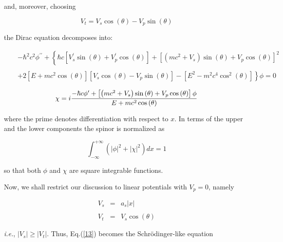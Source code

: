 \documentclass[a4paper,12pt,titlepage]{article}
\begin{document}
\noindent and, moreover, choosing

\begin{equation}
V_{t}=V_{s}\cos \left( \theta \right) -V_{p}\sin \left( \theta \right)
\label{eq12}
\end{equation}

\noindent \noindent the Dirac equation decomposes into:

\begin{eqnarray}
&&-\hbar ^{2}c^{2}\phi ^{\prime \prime }+\left\{ \hbar c\left[ V_{s}^{\prime
}\sin \left( \theta \right) +V_{p}^{\prime }\cos \left( \theta \right)
\right] +\left[ \left( mc^{2}+V_{s}\right) \sin \left( \theta \right)
+V_{p}\cos \left( \theta \right) \right] ^{2}\right.  \nonumber \\
&&  \label{13} \\
&&\left. +2\left[ E+mc^{2}\cos \left( \theta \right) \right] \left[
V_{s}\cos \left( \theta \right) -V_{p}\sin \left( \theta \right) \right]
-\left[ E^{2}-m^{2}c^{4}\cos ^{2}\left( \theta \right) \right] \right\} \phi
=0  \nonumber
\end{eqnarray}

\mathstrut

\begin{equation}
\chi =i\frac{-\hbar c\phi ^{\prime }+\left[ \left( mc^{2}+V_{s}\right) \sin
\left( \theta \right) +V_{p}\cos \left( \theta \right) \right] \phi }{%
E+mc^{2}\cos \left( \theta \right) }  \label{eq14}
\end{equation}

\noindent where the prime denotes differentiation with respect to $x$. In
terms of the upper and the lower components the spinor is normalized as

\begin{equation}
\int_{-\infty }^{+\infty }\left( |\phi |^{2}+|\chi |^{2}\right) dx=1
\label{eq14b}
\end{equation}

\noindent so that both $\phi $ and $\chi $ are square integrable functions.

Now, we shall restrict our discussion to linear potentials with $V_{p}=0$,
namely

\begin{eqnarray}
V_{s} &=&a_{s}|x|  \nonumber \\
&&  \label{eq15} \\
V_{t} &=&V_{s}\cos (\theta )  \nonumber
\end{eqnarray}

\noindent \textit{i.e.}, $|V_{s}|\geq |V_{t}|.$ Thus, Eq.(\ref{13}) becomes
the Schr\"{o}dinger-like equation
\end{document}
